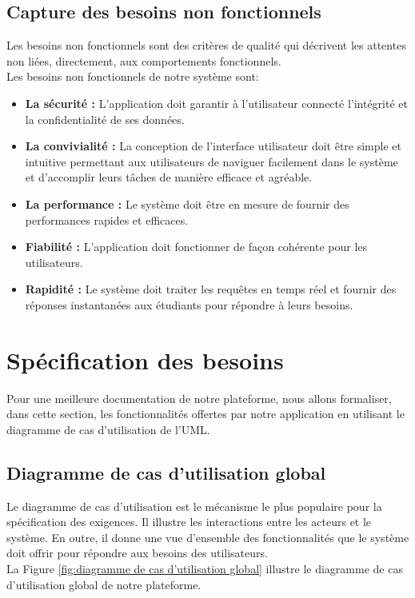 \subsection{Capture des besoins non fonctionnels}
Les besoins non fonctionnels sont des critères de qualité qui décrivent les attentes non liées, directement, aux  comportements fonctionnels.\\
Les besoins non fonctionnels de notre système sont:
\begin{itemize}[itemsep=1pt, parsep=1pt]
    \item \textbf{La sécurité : }L'application doit garantir à l'utilisateur connecté l'intégrité et la confidentialité de ses données.
    \item \textbf{La convivialité : }La conception de l’interface utilisateur doit être simple et intuitive permettant aux utilisateurs de naviguer facilement dans le système et d’accomplir leurs tâches de manière efficace et agréable.
    \item \textbf{La performance : }Le système doit être en mesure de fournir des performances rapides et efficaces.
    \item \textbf{Fiabilité : }L’application doit fonctionner de façon cohérente pour les utilisateurs.
    \item \textbf{Rapidité : }Le système doit traiter les requêtes en temps réel et fournir des réponses instantanées aux étudiants pour répondre à leurs besoins. 
\end{itemize}

\section{Spécification des besoins }
Pour une meilleure documentation de notre plateforme, nous allons formaliser, dans cette section, les fonctionnalités offertes par notre application en utilisant le diagramme de cas d'utilisation de l’UML.

\subsection{Diagramme de cas d’utilisation global}
Le diagramme de cas d'utilisation est le mécanisme le plus populaire pour la spécification des exigences. Il illustre les interactions entre les acteurs et le système. En outre, il donne une vue d'ensemble des fonctionnalités que le système doit offrir pour répondre aux besoins des utilisateurs.\\
\newpage
La Figure \ref{fig:diagramme de cas d’utilisation global} illustre le diagramme de cas d’utilisation global de notre plateforme.

